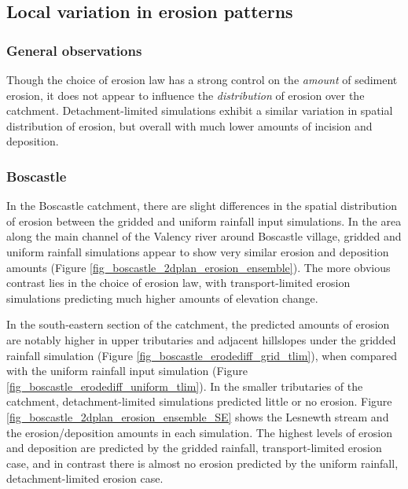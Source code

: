 %
%


\subsection{Local variation in erosion patterns}

\subsubsection{General observations}
Though the choice of erosion law has a strong control on the \textit{amount} of sediment erosion, it does not appear to influence the \textit{distribution} of erosion over the catchment. Detachment-limited simulations exhibit a similar variation in spatial distribution of erosion, but overall with much lower amounts of incision and deposition. 

\subsubsection{Boscastle}
In the Boscastle catchment, there are slight differences in the spatial distribution of erosion between the gridded and uniform rainfall input simulations. In the area along the main channel of the Valency river around Boscastle village, gridded and uniform rainfall simulations appear to show very similar erosion and deposition amounts (Figure \ref{fig_boscastle_2dplan_erosion_ensemble}). The more obvious contrast lies in the choice of erosion law, with transport-limited erosion simulations predicting much higher amounts of elevation change.

In the south-eastern section of the catchment, the predicted amounts of erosion are notably higher in upper tributaries and adjacent hillslopes under the gridded rainfall simulation (Figure \ref{fig_boscastle_erodediff_grid_tlim}), when compared with the uniform rainfall input simulation (Figure \ref{fig_boscastle_erodediff_uniform_tlim}). In the smaller tributaries of the catchment, detachment-limited simulations predicted little or no erosion. Figure \ref{fig_boscastle_2dplan_erosion_ensemble_SE} shows the Lesnewth stream and the erosion/deposition amounts in each simulation. The highest levels of erosion and deposition are predicted by the gridded rainfall, transport-limited erosion case, and in contrast there is almost no erosion predicted by the uniform rainfall, detachment-limited erosion case.


